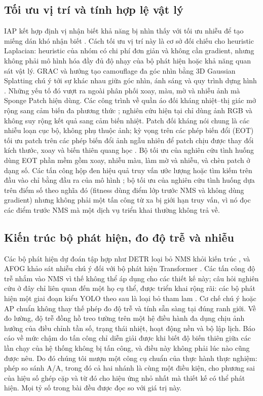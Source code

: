\documentclass[12pt,a4paper]{article}
\begin{document}
\subsection{Tối ưu vị trí và tính hợp lệ vật lý}
IAP kết hợp định vị nhận biết khả năng bị nhìn thấy với tối ưu nhiễu để tạo miếng dán khó nhận biết \cite{iap2025}. Cách tối ưu vị trí này là cơ sở đối chiếu cho heuristic Laplacian: heuristic của nhóm có chi phí đơn giản và không cần gradient, nhưng không phải mô hình hóa đầy đủ độ nhạy của bộ phát hiện hoặc khả năng quan sát vật lý. GRAC và hướng tạo camouflage đa góc nhìn bằng 3D Gaussian Splatting chú ý tới sự khác nhau giữa góc nhìn, ánh sáng và quy trình dựng hình \cite{grac2025,gs3dcamo2025}. Những yếu tố đó vượt ra ngoài phân phối xoay, màu, mờ và nhiễu ảnh mà Sponge Patch hiện dùng. Các công trình về quần áo đối kháng nhiệt--thị giác mở rộng sang cảm biến đa phương thức \cite{rgbt2026,thermal2026}; nghiên cứu hiện tại chỉ dùng ảnh RGB và không suy rộng kết quả sang cảm biến nhiệt. Patch đối kháng nói chung là các nhiễu loạn cục bộ, không phụ thuộc ảnh; kỳ vọng trên các phép biến đổi (EOT) tối ưu patch trên các phép biến đổi ảnh ngẫu nhiên để patch chịu được thay đổi kích thước, xoay và biến thiên quang học \cite{athalye2018eot}. Bộ tối ưu của nghiên cứu tình huống dùng EOT phần mềm gồm xoay, nhiễu màu, làm mờ và nhiễu, và chèn patch ở dạng số. Các tấn công hộp đen hiệu quả truy vấn ước lượng hoặc tìm kiếm trên đầu vào chỉ bằng đầu ra của mô hình \cite{ilyas2018blackbox}; bộ tối ưu của nghiên cứu tình huống dựa trên điểm số theo nghĩa đó (fitness dùng điểm lớp trước NMS và không dùng gradient) nhưng không phải một tấn công từ xa bị giới hạn truy vấn, vì nó đọc các điểm trước NMS mà một dịch vụ triển khai thường không trả về.

\subsection{Kiến trúc bộ phát hiện, đo độ trễ và nhiễu}
Các bộ phát hiện dự đoán tập hợp như DETR loại bỏ NMS khỏi kiến trúc \cite{carion2020detr}, và AFOG khảo sát nhiễu chú ý đối với bộ phát hiện Transformer \cite{afog2025}. Các tấn công độ trễ nhắm vào NMS vì thế không thể áp dụng cho các thiết kế này; câu hỏi nghiên cứu ở đây chỉ liên quan đến một họ cụ thể, được triển khai rộng rãi: các bộ phát hiện một giai đoạn kiểu YOLO theo sau là loại bỏ tham lam \cite{redmon2016yolo,neubeck2006nms}. Cơ chế chú ý hoặc AP chuẩn không thay thế phép đo độ trễ và tính sẵn sàng tại đúng ranh giới. Về đo lường, độ trễ đồng hồ treo tường trên một hệ điều hành đa dụng chịu ảnh hưởng của điều chỉnh tần số, trạng thái nhiệt, hoạt động nền và bộ lập lịch. Báo cáo về mức chậm do tấn công chỉ diễn giải được khi biết độ biến thiên giữa các lần chạy của hệ thống không bị tấn công, và điều này không phải lúc nào cũng được nêu. Do đó chúng tôi mượn một công cụ chuẩn của thực hành thực nghiệm: phép so sánh A/A, trong đó cả hai nhánh là cùng một điều kiện, cho phương sai của hiệu số ghép cặp và từ đó cho hiệu ứng nhỏ nhất mà thiết kế có thể phát hiện. Mọi tỷ số trong bài đều được đọc so với giá trị này.
\end{document}
